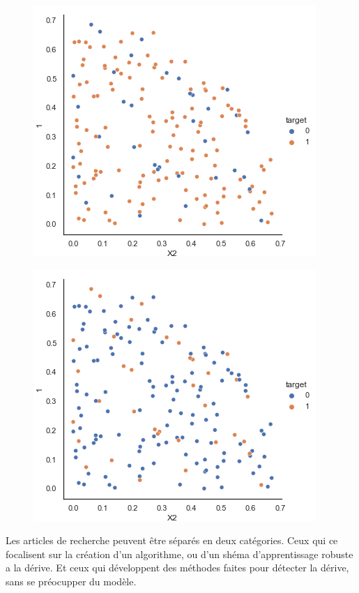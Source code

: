 \documentclass[11pt,a4paper]{report}
\begin{document}
\begin{figure}
\centering
\begin{minipage}{.5\textwidth}
  \centering
  \includegraphics[width=0.7\linewidth]{P_x_before.png}
  \label{fig:test1}
\end{minipage}%
\begin{minipage}{.5\textwidth}
  \centering
  \includegraphics[width=0.7\linewidth]{P_x_later.png}
  \label{fig:test2}
\end{minipage}
\end{figure}

\newpage

Les articles de recherche peuvent être séparés en deux catégories. Ceux qui ce focalisent sur la création d'un algorithme, ou d'un shéma d'apprentissage robuste a la dérive. Et ceux qui développent des méthodes faites pour détecter la dérive, sans se préocupper du modèle.
\end{document}
